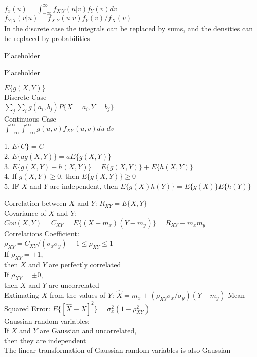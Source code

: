 $f_x(u)=\int_{-\infty}^{\infty}f_{X|Y}(u|v)f_Y(v)dv$ \\
$f_{Y|X}(v|u)=f_{X|Y}(u|v)f_Y(v)/f_X(v)$ \\
In the discrete case the integrals can be replaced by sums, and the densities can be replaced by probabilities

Placeholder

Placeholder


$E\{g(X,Y)\}=$ \\
Discrete Case \\
$\sum_j\sum_ig(a_i,b_j)P\{X=a_i,Y=b_j\}$ \\
Continuous Case \\
$\int_{-\infty}^{\infty}\int_{-\infty}^{\infty}g(u,v)f_{XY}(u,v)du \; dv$

1. $E\{C\}=C$ \\
2. $E\{ag(X,Y)\}=aE\{g(X,Y)\}$ \\
3. $E\{g(X,Y) + h(X,Y)\}=E\{g(X,Y)\} + E\{h(X,Y)\}$ \\
4. If $g(X,Y) \geq 0$, then $ E\{g(X,Y)\}\geq 0$ \\
5. IF $X$ and $Y$ are independent, then $E\{g(X)h(Y)\}=E\{g(X)\}E\{h(Y)\}$

Correlation between $X$ and $Y$: $R_{XY}=E\{X,Y\}$ \\
Covariance of $X$ and $Y$: $Cov(X,Y)=C_{XY}=E\{(X-m_x)(Y-m_y)\}=R_{XY}-m_xm_y$ \\
Correlations Coefficient: \\
$\rho_{XY}=C_{XY}/(\sigma_x \sigma_y)-1 \leq \rho_{XY}\leq 1$ \\
If $\rho_{XY}=\pm 1$, \\ then $X$ and $Y$ are perfectly correlated \\
If $\rho_{XY}=\pm 0$, \\ then $X$ and $Y$ are uncorrelated \\


Extimating $X$ from the values of $Y$: $\hat{X}=m_x+(\rho_{XY}\sigma_x/\sigma_y)(Y-m_y)$
Mean-Squared Error: $E\{[\hat{X}-X]^2\}=\sigma_x^2(1-\rho_{XY}^2)$ \\
Gaussian random variables: \\
If $X$ and $Y$ are Gaussian and uncorrelated, \\then they are independent \\
The linear transformation of Gaussian random variables is also Gaussian 

